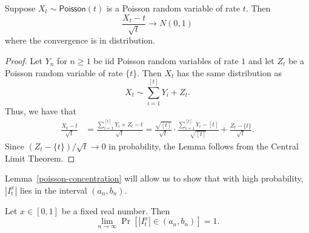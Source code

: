 \documentclass[12pt]{article}
\begin{document}
\begin{lem} \label{poisson-concentration}
	Suppose $X_t \sim \mathsf{Poisson}(t)$ is a Poisson random variable of rate $t$. Then 
	\[
		\frac{X_t - t}{\sqrt{t}} \longrightarrow N(0, 1)
	\]
	where the convergence is in distribution. 
\end{lem}

\begin{proof}
	Let $Y_n$ for $n \geq 1$ be iid Poisson random variables of rate $1$ and let $Z_t$ be a Poisson random variable of rate $\{t\}$. Then $X_t$ has the same distribution as 
	\[
		X_t \sim \sum_{i = 1}^{[t]} Y_i + Z_t.	
	\]
	Thus, we have that 
	\begin{align*}
		\frac{X_t - t}{\sqrt{t}} & = \frac{\sum_{i = 1}^{[t]} Y_i + Z_t-t}{\sqrt{t}} = \frac{\sqrt{[t]}}{\sqrt{t}} \cdot \frac{\sum_{i = 1}^{[t]} Y_i - [t]}{\sqrt{[t]}} + \frac{Z_t - \{t\}}{\sqrt{t}}.
	\end{align*}
	Since $(Z_t - \{t\})/\sqrt{t} \to 0$ in probability, the Lemma follows from the Central Limit Theorem. 
\end{proof}

Lemma~\ref{poisson-concentration} will allow us to show that with high probability, $|I_t^x|$ lies in the interval $(a_n, b_n)$.

\begin{lem} \label{high-probability-YES}
	Let $x \in [0, 1]$ be a fixed real number. Then 
	\[
		\lim_{n \to \infty} \Pr [ |I_t^x| \in (a_n, b_n) ] = 1. 
	\]
\end{lem}
\end{document}
